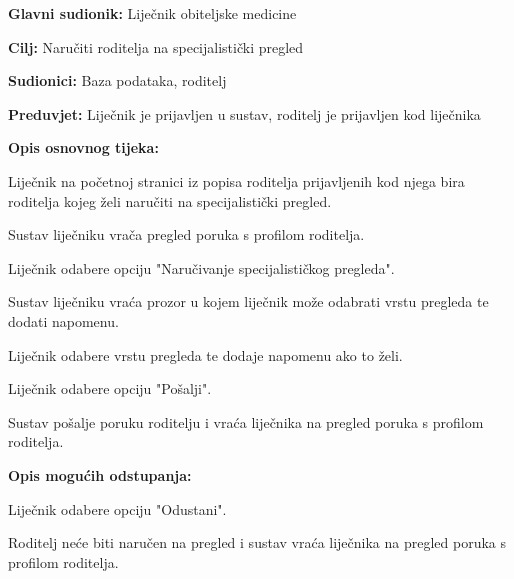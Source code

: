 					\noindent {}
					\begin{packed_item}
						
						\item \textbf{Glavni sudionik: }Liječnik obiteljske medicine
						\item  \textbf{Cilj:} Naručiti roditelja na specijalistički pregled
						\item  \textbf{Sudionici:} Baza podataka, roditelj
						\item  \textbf{Preduvjet:} Liječnik je prijavljen u sustav, roditelj je prijavljen kod liječnika
						\item  \textbf{Opis osnovnog tijeka:}
						
						\item[] \begin{packed_enum}
							
							\item Liječnik na početnoj stranici iz popisa roditelja prijavljenih kod njega bira roditelja kojeg želi naručiti na specijalistički pregled.
							\item Sustav liječniku vrača pregled poruka s profilom roditelja.
							\item Liječnik odabere opciju "Naručivanje specijalističkog pregleda".
							\item Sustav liječniku vraća prozor u kojem liječnik može odabrati vrstu pregleda te dodati napomenu.
							\item Liječnik odabere vrstu pregleda te dodaje napomenu ako to želi.
							\item Liječnik odabere opciju "Pošalji".
							\item Sustav pošalje poruku roditelju i vraća liječnika na pregled poruka s profilom roditelja.
						\end{packed_enum}
						
						\item  \textbf{Opis mogućih odstupanja:}
						
						\item[] \begin{packed_item}
							
							\item[6.a] Liječnik odabere opciju "Odustani".
							\item[] \begin{packed_enum}
								
								\item Roditelj neće biti naručen na pregled i sustav vraća liječnika na pregled poruka s profilom roditelja.
							\end{packed_enum}
							
							
						\end{packed_item}
						
						
					\end{packed_item}
					
